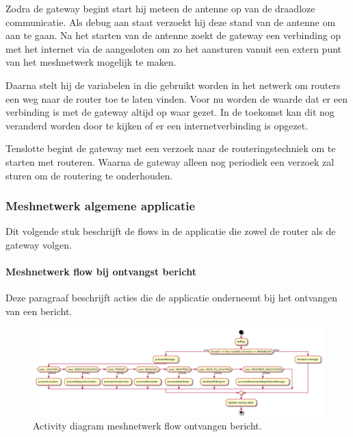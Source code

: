 \documentclass[a4paper, 11pt, oneside]{report}
\begin{document}
Zodra de gateway begint start hij meteen de antenne op van de draadloze communicatie.
Als debug aan staat verzoekt hij deze stand van de antenne om aan te gaan.
Na het starten van de antenne zoekt de gateway een verbinding op met het internet via de aangesloten  om zo het aansturen vanuit een extern punt van het meshnetwerk mogelijk te maken.

Daarna stelt hij de variabelen in die gebruikt worden in het netwerk om routers een weg naar de router toe te laten vinden. Voor nu worden de waarde dat er een verbinding is met de gateway altijd op waar gezet. In de toekomst kan dit nog veranderd worden door te kijken of er een internetverbinding is opgezet. 

Tenslotte begint de gateway met een verzoek naar de routeringstechniek om te starten met routeren. Waarna de gateway alleen nog periodiek een verzoek zal sturen om de routering te onderhouden.

\subsubsection{Meshnetwerk algemene applicatie}
Dit volgende stuk beschrijft de flows in de applicatie die zowel de router als de gateway volgen. 

\paragraph{Meshnetwerk flow bij ontvangst bericht}
\label{DetailedDesign:Communicatie:Activity:meshcomponent:onmsg}
Deze paragraaf beschrijft acties die de applicatie onderneemt bij het ontvangen van een bericht. 
\begin{figure}[H]
	\begin{center}\includegraphics[width=1\linewidth]{UML/out/Communication/activity/processMessage/processMessage.png}\end{center}
	\caption{Activity diagram meshnetwerk flow ontvangen bericht.}
	\label{fig:communication:meshcomponent:onmsg}
\end{figure}
\end{document}
